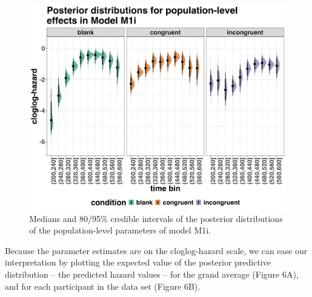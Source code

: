 \documentclass[
  man, donotrepeattitle,floatsintext]{apa6}
\begin{document}
\begin{figure}[H]

{\centering \includegraphics[width=0.8\linewidth,height=0.67\textheight,]{../Tutorial_2_Bayesian/figures/M1i_postdistr} 

}

\caption{Medians and 80/95\% credible intervals of the posterior distributions of the population-level parameters of model M1i.}\label{fig:plot-fixed-effects}
\end{figure}

Because the parameter estimates are on the cloglog-hazard scale, we can ease our interpretation by plotting the expected value of the posterior predictive distribution -- the predicted hazard values -- for the grand average (Figure 6A), and for each participant in the data set (Figure 6B).
\end{document}
